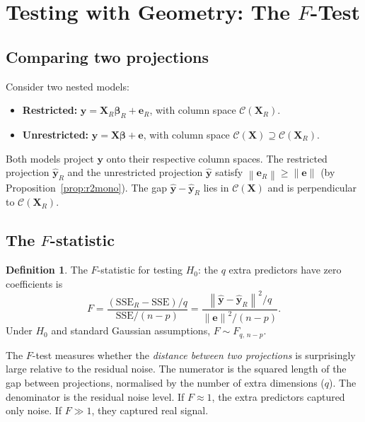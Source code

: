 \documentclass[11pt,a4paper]{article}
\theoremstyle{plain}
\theoremstyle{definition}
\newtheorem{definition}[theorem]{Definition}
\newcommand{\yhat}{\hat{\bm{y}}}
\newcommand{\bX}{\bm{X}}
\newcommand{\by}{\bm{y}}
\newcommand{\be}{\bm{e}}
\newcommand{\Col}{\mathcal{C}}
\newcommand{\norm}[1]{\left\lVert #1 \right\rVert}
\begin{document}
\section{Testing with Geometry: The $F$-Test}\label{sec:ftest}

\subsection{Comparing two projections}

Consider two nested models:
\begin{itemize}[nosep]
  \item \textbf{Restricted:} $\by = \bX_R\bm{\beta}_R + \be_R$,
        with column space $\Col(\bX_R)$.
  \item \textbf{Unrestricted:} $\by = \bX\bm{\beta} + \be$,
        with column space $\Col(\bX)\supseteq\Col(\bX_R)$.
\end{itemize}
Both models project $\by$ onto their respective column spaces.
The restricted projection $\yhat_R$ and the unrestricted projection
$\yhat$ satisfy $\norm{\be_R}\ge\norm{\be}$ (by Proposition~\ref{prop:r2mono}).
The gap $\yhat - \yhat_R$ lies in $\Col(\bX)$ and is perpendicular to
$\Col(\bX_R)$.

\subsection{The $F$-statistic}

\begin{definition}
The $F$-statistic for testing $H_0$: the $q$ extra predictors
have zero coefficients is
\begin{equation}\label{eq:fstat}
  F = \frac{(\text{SSE}_R - \text{SSE})/q}{\text{SSE}/(n-p)}
    = \frac{\norm{\yhat-\yhat_R}^2/q}{\norm{\be}^2/(n-p)}.
\end{equation}
Under $H_0$ and standard Gaussian assumptions,
$F\sim F_{q,\,n-p}$.
\end{definition}

\begin{keyinsight}
The $F$-test measures whether the \emph{distance between two projections}
is surprisingly large relative to the residual noise.
The numerator is the squared length of the gap between projections,
normalised by the number of extra dimensions ($q$).
The denominator is the residual noise level.
If $F\approx 1$, the extra predictors captured only noise.
If $F\gg 1$, they captured real signal.
\end{keyinsight}
\end{document}
